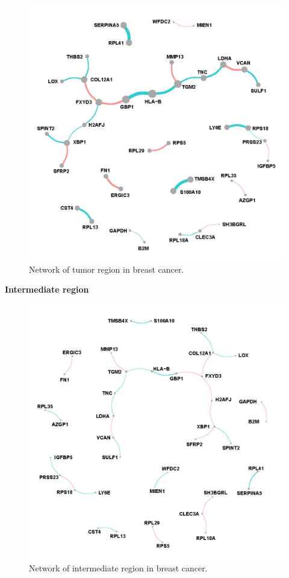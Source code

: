 \documentclass[
]{book}
\begin{document}
\begin{figure}

{\centering \includegraphics[width=0.7\linewidth]{images/location_c3_full} 

}

\caption{Network of tumor region in breast cancer.}\label{fig:STtumornet}
\end{figure}

\textbf{Intermediate region}

\begin{figure}

{\centering \includegraphics[width=0.7\linewidth]{images/location_c2_full} 

}

\caption{Network of intermediate region in breast cancer.}\label{fig:STinternet}
\end{figure}
\end{document}
